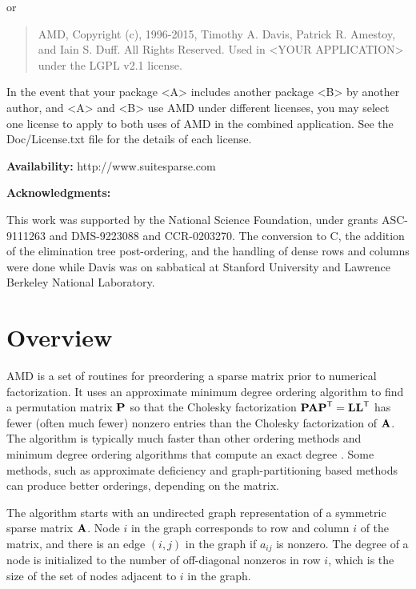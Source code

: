 \documentclass[11pt]{article}
\newcommand{\m}[1]{{\bf{#1}}}       %
\newcommand{\tr}{^{\sf T}}          %
\begin{document}
or

    \begin{quote}
    AMD, Copyright (c), 1996-2015, Timothy A. Davis,
    Patrick R. Amestoy, and Iain S. Duff.  All Rights Reserved.
    Used in <YOUR APPLICATION> under the LGPL v2.1 license.
    \end{quote}

In the event that your package <A> includes another package <B> by another
author, and <A> and <B> use AMD under different licenses, you may select
one license to apply to both uses of AMD in the combined application.
See the Doc/License.txt file for the details of each license.

{\bf Availability:}
    http://www.suitesparse.com

{\bf Acknowledgments:}

    This work was supported by the National Science Foundation, under
    grants ASC-9111263 and DMS-9223088 and CCR-0203270.
    The conversion to C, the addition of the elimination tree
    post-ordering, and the handling of dense rows and columns
    were done while Davis was on sabbatical at
    Stanford University and Lawrence Berkeley National Laboratory.

\newpage
\section{Overview}

AMD is a set of routines for preordering a sparse matrix prior to
numerical factorization.  It uses an approximate minimum degree ordering
algorithm \cite{AmestoyDavisDuff96,AmestoyDavisDuff04}
to find a permutation matrix $\m{P}$
so that the Cholesky factorization $\m{PAP}\tr=\m{LL}\tr$ has fewer
(often much fewer) nonzero entries than the Cholesky factorization of $\m{A}$.
The algorithm is typically much faster than other ordering methods
and  minimum degree ordering
algorithms that compute an exact degree \cite{GeorgeLiu89}.
Some methods, such as approximate deficiency
\cite{RothbergEisenstat98} and graph-partitioning based methods
\cite{Chaco,KarypisKumar98e,PellegriniRomanAmestoy00,schu:01}
can produce better orderings, depending on the matrix.

The algorithm starts with an undirected graph representation of a
symmetric sparse matrix $\m{A}$.  Node $i$ in the graph corresponds to row
and column $i$ of the matrix, and there is an edge $(i,j)$ in the graph if
$a_{ij}$ is nonzero.
The degree of a node is initialized to the number of off-diagonal nonzeros
in row $i$, which is the size of the set of nodes
adjacent to $i$ in the graph.
\end{document}
